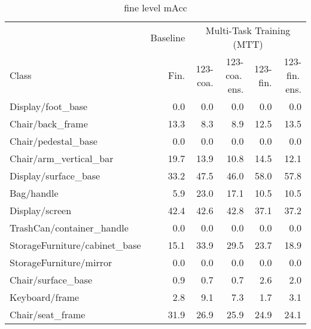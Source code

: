 \begin{table}[!h]
\caption{fine level mAcc}
\centering
\begin{tabular}{lrrrrr}
\toprule
 &  \multicolumn{1}{c}{Baseline} & \multicolumn{4}{c}{Multi-Task Training (MTT)} \\
 \cmidrule{3-6}
Class 			  &  	 Fin. &  	123-coa. &  		123-coa.\,ens. &  	  123-fin. &  123-fin.\,ens. \\
\midrule
Display/foot\_base              &            0.0 &             0.0 &                     0.0 &           0.0 &                   0.0 \\
Chair/back\_frame               &           13.3 &             8.3 &                     8.9 &          12.5 &                  13.5 \\
Chair/pedestal\_base            &            0.0 &             0.0 &                     0.0 &           0.0 &                   0.0 \\
Chair/arm\_vertical\_bar         &           19.7 &            13.9 &                    10.8 &          14.5 &                  12.1 \\
Display/surface\_base           &           33.2 &            47.5 &                    46.0 &          58.0 &                  57.8 \\
Bag/handle                     &            5.9 &            23.0 &                    17.1 &          10.5 &                  10.5 \\
Display/screen                 &           42.4 &            42.6 &                    42.8 &          37.1 &                  37.2 \\
TrashCan/container\_handle      &            0.0 &             0.0 &                     0.0 &           0.0 &                   0.0 \\
StorageFurniture/cabinet\_base  &           15.1 &            33.9 &                    29.5 &          23.7 &                  18.9 \\
StorageFurniture/mirror        &            0.0 &             0.0 &                     0.0 &           0.0 &                   0.0 \\
Chair/surface\_base             &            0.9 &             0.7 &                     0.7 &           2.6 &                   2.0 \\
Keyboard/frame                 &            2.8 &             9.1 &                     7.3 &           1.7 &                   3.1 \\
Chair/seat\_frame               &           31.9 &            26.9 &                    25.9 &          24.9 &                  24.1 \\

\end{tabular}
\end{table}
